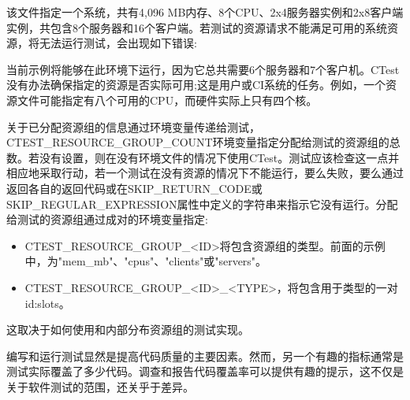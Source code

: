 该文件指定一个系统，共有4,096 MB内存、8个CPU、2x4服务器实例和2x8客户端实例，共包含8个服务器和16个客户端。若测试的资源请求不能满足可用的系统资源，将无法运行测试，会出现如下错误:


当前示例将能够在此环境下运行，因为它总共需要6个服务器和7个客户机。CTest没有办法确保指定的资源是否实际可用;这是用户或CI系统的任务。例如，一个资源文件可能指定有八个可用的CPU，而硬件实际上只有四个核。

关于已分配资源组的信息通过环境变量传递给测试，CTEST\_RESOURCE\_GROUP\_COUNT环境变量指定分配给测试的资源组的总数。若没有设置，则在没有环境文件的情况下使用CTest。测试应该检查这一点并相应地采取行动，若一个测试在没有资源的情况下不能运行，要么失败，要么通过返回各自的返回代码或在SKIP\_RETURN\_CODE或SKIP\_REGULAR\_EXPRESSION属性中定义的字符串来指示它没有运行。分配给测试的资源组通过成对的环境变量指定:

\begin{itemize}
\item 
CTEST\_RESOURCE\_GROUP\_<ID>将包含资源组的类型。前面的示例中，为"mem\_mb"、"cpus"、"clients"或"servers"。

\item 
CTEST\_RESOURCE\_GROUP\_<ID>\_<TYPE>，将包含用于类型的一对id:slots。
\end{itemize}

这取决于如何使用和内部分布资源组的测试实现。

编写和运行测试显然是提高代码质量的主要因素。然而，另一个有趣的指标通常是测试实际覆盖了多少代码。调查和报告代码覆盖率可以提供有趣的提示，这不仅是关于软件测试的范围，还关乎于差异。


















